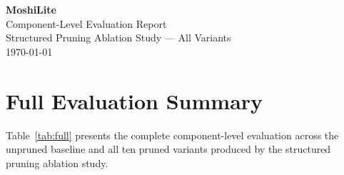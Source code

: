 \documentclass[11pt,a4paper]{article}
\begin{document}
\begin{center}
  {\Huge\bfseries\textcolor{headerblue}{MoshiLite}}\\[6pt]
  {\Large Component-Level Evaluation Report}\\[4pt]
  {\large\textcolor{neutralgray}{Structured Pruning Ablation Study — All Variants}}\\[10pt]
  {\normalsize\today}
\end{center}
\vspace{1em}

\section{Full Evaluation Summary}

Table~\ref{tab:full} presents the complete component-level evaluation across the unpruned baseline and all ten pruned variants produced by the structured pruning ablation study.
\end{document}
